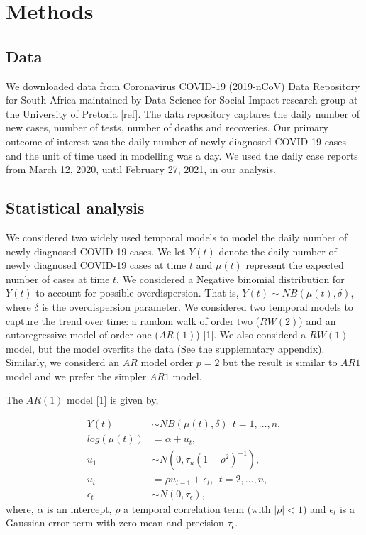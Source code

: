 \documentclass[10pt,letterpaper]{article}
\begin{document}
\hypertarget{methods}{%
\section{Methods}\label{methods}}

\hypertarget{data}{%
\subsection{Data}\label{data}}

We downloaded data from Coronavirus COVID-19 (2019-nCoV) Data Repository
for South Africa maintained by Data Science for Social Impact research
group at the University of Pretoria {[}ref{]}. The data repository
captures the daily number of new cases, number of tests, number of
deaths and recoveries. Our primary outcome of interest was the daily
number of newly diagnosed COVID-19 cases and the unit of time used in
modelling was a day. We used the daily case reports from March 12, 2020,
until February 27, 2021, in our analysis.

\hypertarget{statistical-analysis}{%
\subsection{Statistical analysis}\label{statistical-analysis}}

We considered two widely used temporal models to model the daily number
of newly diagnosed COVID-19 cases. We let \(Y(t)\) denote the daily
number of newly diagnosed COVID-19 cases at time \(t\) and \(\mu(t)\)
represent the expected number of cases at time \(t\). We considered a
Negative binomial distribution for \(Y(t)\) to account for possible
overdispersion. That is, \(Y(t) \sim NB(\mu(t), \delta)\), where
\(\delta\) is the overdispersion parameter. We considered two temporal
models to capture the trend over time: a random walk of order two
(\(RW(2)\)) and an autoregressive model of order one (\(AR(1)\))
{[}1{]}. We also considerd a \(RW(1)\) model, but the model overfits the
data (See the supplemntary appendix). Similarly, we considerd an \(AR\)
model order \(p=2\) but the result is similar to \(AR1\) model and we
prefer the simpler \(AR1\) model.

The \(AR(1)\) model {[}1{]} is given by,

\[
\begin{aligned}
 Y(t) &\sim NB(\mu(t), \delta) \ \ t=1, \dots, n,\\
 log(\mu(t)) &= \alpha+u_t, \\
 u_1 &\sim N(0, \tau_u(1-\rho^2)^{-1}),  \\
  u_t &=\rho u_{t-1} +\epsilon_t, \ \ t=2, \dots, n,  \\
  \epsilon_t & \sim N(0, \tau_{\epsilon}),
\end{aligned}
\] where, \(\alpha\) is an intercept, \(\rho\) a temporal correlation
term (with \(|\rho|<1\)) and \(\epsilon_t\) is a Gaussian error term
with zero mean and precision \(\tau_{\epsilon}\).
\end{document}
